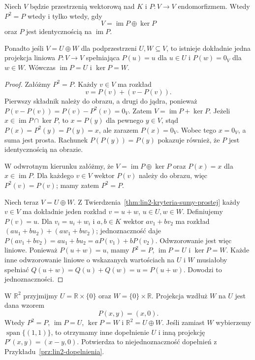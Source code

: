 \begin{twierdzenie}
\label{thm:lin3-projekcja-suma}
Niech \(V\) będzie przestrzenią wektorową nad \(K\)
i \(P\colon V\to V\) endomorfizmem.
Wtedy \(P^2=P\) wtedy i tylko wtedy, gdy
\[
 V=\operatorname{im}P\oplus\ker P
\]
oraz \(P\) jest identycznością na
\(\operatorname{im}P\).

Ponadto jeśli \(V=U\oplus W\)
dla podprzestrzeni \(U,W\subseteq V\),
to istnieje dokładnie jedna projekcja liniowa
\(P\colon V\to V\) spełniająca
\(P(u)=u\) dla \(u\in U\) i \(P(w)=0_V\)
dla \(w\in W\). Wówczas
\(\operatorname{im}P=U\) i \(\ker P=W\).
\end{twierdzenie}
\begin{proof}
Załóżmy \(P^2=P\). Każdy \(v\in V\)
ma rozkład
\[
 v=P(v)+(v-P(v)).
\]
Pierwszy składnik należy do obrazu,
a drugi do jądra, ponieważ
\(P(v-P(v))=P(v)-P^2(v)=0_V\).
Zatem \(V=\operatorname{im}P+\ker P\).
Jeżeli \(x\in\operatorname{im}P\cap\ker P\),
to \(x=P(y)\) dla pewnego \(y\in V\),
stąd \(P(x)=P^2(y)=P(y)=x\),
ale zarazem \(P(x)=0_V\).
Wobec tego \(x=0_V\), a suma jest prosta.
Rachunek \(P(P(y))=P(y)\) pokazuje również,
że \(P\) jest identycznością na obrazie.

W odwrotnym kierunku załóżmy,
że \(V=\operatorname{im}P\oplus\ker P\)
oraz \(P(x)=x\) dla \(x\in\operatorname{im}P\).
Dla każdego \(v\in V\) wektor \(P(v)\)
należy do obrazu, więc \(P^2(v)=P(v)\);
mamy zatem \(P^2=P\).

Niech teraz \(V=U\oplus W\).
Z Twierdzenia~\ref{thm:lin2-kryteria-sumy-prostej}
każdy \(v\in V\) ma dokładnie jeden rozkład
\(v=u+w\), \(u\in U,w\in W\).
Definiujemy \(P(v)=u\).
Dla \(v_i=u_i+w_i\) i \(a,b\in K\)
wektor \(av_1+bv_2\) ma rozkład
\((au_1+bu_2)+(aw_1+bw_2)\);
jednoznaczność daje
\(P(av_1+bv_2)=au_1+bu_2
 =aP(v_1)+bP(v_2)\).
Odwzorowanie jest więc liniowe.
Ponieważ \(P(u+w)=u\), mamy
\(P^2=P\), \(\operatorname{im}P=U\)
i \(\ker P=W\).
Każde inne odwzorowanie liniowe o wskazanych
wartościach na \(U\) i \(W\) musiałoby spełniać
\(Q(u+w)=Q(u)+Q(w)=u=P(u+w)\).
Dowodzi to jednoznaczności.
\end{proof}

\begin{przyklad}[Projekcja na oś]
\label{prz:lin3-projekcja-os}
W \(\mathbb R^2\) przyjmijmy
\(U=\mathbb R\times\{0\}\) oraz
\(W=\{0\}\times\mathbb R\).
Projekcja wzdłuż \(W\) na \(U\) jest dana wzorem
\[
 P(x,y)=(x,0).
\]
Wtedy \(P^2=P\), \(\operatorname{im}P=U\),
\(\ker P=W\) i \(\mathbb R^2=U\oplus W\).
Jeśli zamiast \(W\) wybierzemy
\(\operatorname{span}\{(1,1)\}\),
to otrzymamy inne dopełnienie \(U\)
i inną projekcję \(P'(x,y)=(x-y,0)\).
Potwierdza to niejednoznaczność dopełnień
z Przykładu~\ref{prz:lin2-dopelnienia}.
\end{przyklad}

